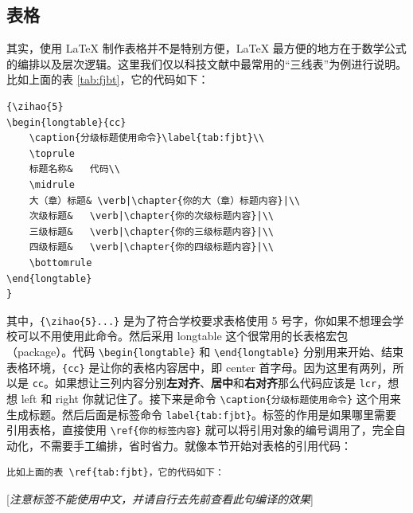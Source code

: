 \subsection{表格}\label{text:table}
其实，使用 LaTeX 制作表格并不是特别方便，LaTeX 最方便的地方在于数学公式的编排以及层次逻辑。这里我们仅以科技文献中最常用的“三线表”为例进行说明。比如上面的表 \ref{tab:fjbt}，它的代码如下：
\begin{Verbatim}[frame=single]
{\zihao{5}
\begin{longtable}{cc}
	\caption{分级标题使用命令}\label{tab:fjbt}\\
	\toprule
	标题名称&	代码\\
	\midrule
	大（章）标题&	\verb|\chapter{你的大（章）标题内容}|\\
	次级标题&	\verb|\chapter{你的次级标题内容}|\\
	三级标题&	\verb|\chapter{你的三级标题内容}|\\
	四级标题&	\verb|\chapter{你的四级标题内容}|\\
	\bottomrule
\end{longtable}
}
\end{Verbatim}
其中，\verb|{\zihao{5}...}| 是为了符合学校要求表格使用 5 号字，你如果不想理会学校可以不用使用此命令。然后采用 longtable 这个很常用的长表格宏包（package）。代码 \verb|\begin{longtable}| 和 \verb|\end{longtable}| 分别用来开始、结束表格环境，\verb|{cc}| 是让你的表格内容居中，即 center 首字母。因为这里有两列，所以是 \verb|cc|。如果想让三列内容分别{\bf 左对齐}、{\bf 居中}和{\bf 右对齐}那么代码应该是 \verb|lcr|，想想 left 和 right 你就记住了。接下来是命令 \verb|\caption{分级标题使用命令}| 这个用来生成标题。然后后面是标签命令 \verb|label{tab:fjbt}|。标签的作用是如果哪里需要引用表格，直接使用 \verb|\ref{你的标签内容}| 就可以将引用对象的编号调用了，完全自动化，不需要手工编排，省时省力。就像本节开始对表格的引用代码：
\begin{Verbatim}[frame=single]
比如上面的表 \ref{tab:fjbt}，它的代码如下：
\end{Verbatim}
[{\sl 注意标签不能使用中文，并请自行去先前查看此句编译的效果}]

